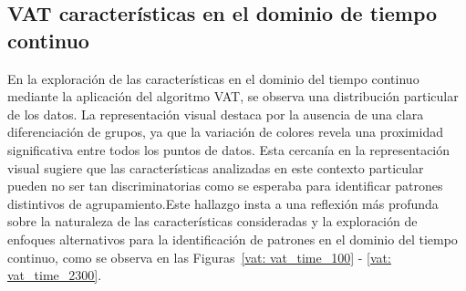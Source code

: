 \subsection{VAT características en el dominio de tiempo continuo}
En la exploración de las características en el dominio del tiempo continuo mediante la aplicación del algoritmo VAT, se observa una distribución particular de los datos. La representación visual destaca por la ausencia de una clara diferenciación de grupos, ya que la variación de colores revela una proximidad significativa entre todos los puntos de datos. Esta cercanía en la representación visual sugiere que las características analizadas en este contexto particular pueden no ser tan discriminatorias como se esperaba para identificar patrones distintivos de agrupamiento.Este hallazgo insta a una reflexión más profunda sobre la naturaleza de las características consideradas y la exploración de enfoques alternativos para la identificación de patrones en el dominio del tiempo continuo, como se observa en las Figuras~\ref{vat: vat_time_100} - \ref{vat: vat_time_2300}. 

